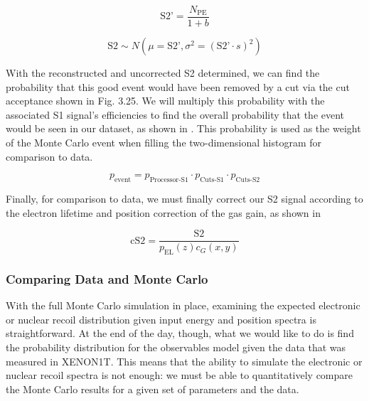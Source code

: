 \begin{equation}
        \label{eqn:xe1t_s2_bias}
        \textrm{S2'} = \frac{N_{\textrm{PE}}}{1 + b}
\end{equation}


\begin{equation}
        \label{eqn:xe1t_s2_smearing}
        \textrm{S2} \sim N(\mu = \textrm{S2'}, \sigma^2 = (\textrm{S2'} \cdot s)^2)
\end{equation}

With the reconstructed and uncorrected S2 determined, we can find the probability that this good event would have been removed by a cut via the cut acceptance shown in Fig. 3.25. We will multiply this probability with the associated S1 signal's efficiencies to find the overall probability that the event would be seen in our dataset, as shown in .  This probability is used as the weight of the Monte Carlo event when filling the two-dimensional histogram for comparison to data.

\begin{equation}
        \label{eqn:xe1t_event_weight}
        p_{\textrm{event}} = p_{\textrm{Processor-S1}} \cdot p_{\textrm{Cuts-S1}} \cdot p_{\textrm{Cuts-S2}}
\end{equation}

Finally, for comparison to data, we must finally correct our S2 signal according to the electron lifetime and position correction of the gas gain, as shown in 


\begin{equation}
        \label{eqn:s2_correction}
        \textrm{cS2} = \frac{\textrm{S2}}{p_{\textrm{EL}}(z) c_G(x, y)} 
\end{equation}


\subsubsection{Comparing Data and Monte Carlo}
\label{sec:xe1t_mc_likelihood}

With the full Monte Carlo simulation in place, examining the expected electronic or nuclear recoil distribution given input energy and position spectra is straightforward.  At the end of the day, though, what we would like to do is find the probability distribution for the observables model given the data that was measured in XENON1T.  This means that the ability to simulate the electronic or nuclear recoil spectra is not enough: we must be able to quantitatively compare the Monte Carlo results for a given set of parameters and the data.

